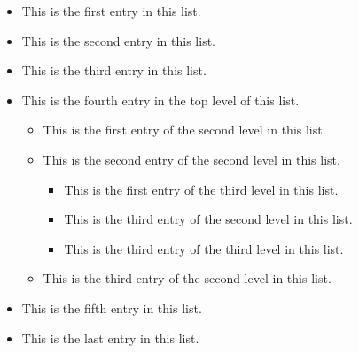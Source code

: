 \documentclass[dc]{svjour}
\begin{document}
\begin{itemize}
\item This is the first entry in this list.
\item This is the second entry in this list.
\item This is the third entry in this list.
\item This is the fourth entry in the top level of this list.
\begin{itemize}
\item This is the first entry of the second level in this list.
\item This is the second entry of the second level in this list.
\begin{itemize}
\item This is the first entry of the third level in this list.
\item This is the third entry of the second level in this list.
\item This is the third entry of the third level in this list.
\end{itemize}
\item This is the third entry of the second level in this list.
\end{itemize}
\item This is the fifth entry in this list.
\item This is the last entry in this list.
\end{itemize}
\end{document}
